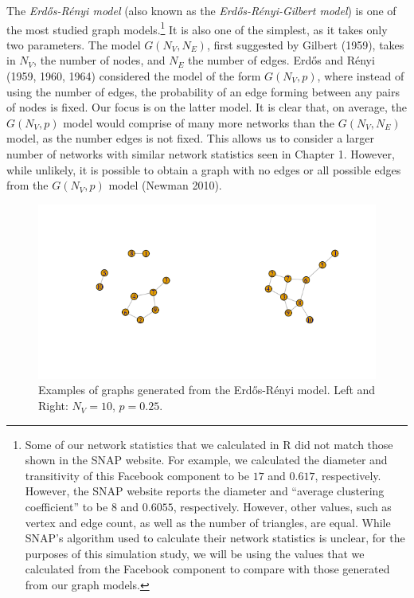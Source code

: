 \documentclass[12pt,twoside]{amherstthesis}
\begin{document}
  The \emph{Erdős-Rényi model} (also known as the
  \emph{Erdős-Rényi-Gilbert model}) is one of the most studied graph
  models.\footnote{Some of our network statistics that we calculated in R
    did not match those shown in the SNAP website. For example, we
    calculated the diameter and transitivity of this Facebook component to
    be \(17\) and \(0.617\), respectively. However, the SNAP website
    reports the diameter and ``average clustering coefficient'' to be
    \(8\) and \(0.6055\), respectively. However, other values, such as
    vertex and edge count, as well as the number of triangles, are equal.
    While SNAP's algorithm used to calculate their network statistics is
    unclear, for the purposes of this simulation study, we will be using
    the values that we calculated from the Facebook component to compare
    with those generated from our graph models.} It is also one of the
  simplest, as it takes only two parameters. The model \(G(N_V, N_E)\),
  first suggested by Gilbert (1959), takes in \(N_V\), the number of
  nodes, and \(N_E\) the number of edges. Erdős and Rényi (1959, 1960,
  1964) considered the model of the form \(G(N_{V}, p)\), where instead of
  using the number of edges, the probability of an edge forming between
  any pairs of nodes is fixed. Our focus is on the latter model. It is
  clear that, on average, the \(G(N_{V}, p)\) model would comprise of many
  more networks than the \(G(N_V, N_E)\) model, as the number edges is not
  fixed. This allows us to consider a larger number of networks with
  similar network statistics seen in Chapter 1. However, while unlikely,
  it is possible to obtain a graph with no edges or all possible edges
  from the \(G(N_{V}, p)\) model (Newman 2010).
  
  \begin{figure}[htbp]
  \centering
  \includegraphics{figure/21erdosrenyiexample.png}
  \caption{Examples of graphs generated from the Erdős-Rényi model. Left
  and Right: \(N_V = 10\), \(p = 0.25\).}
  \end{figure}
  
\end{document}
